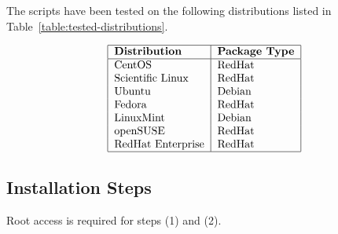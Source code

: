 \documentclass[12pt]{article}
\begin{document}
The scripts have been tested on the following distributions listed in
Table~\ref{table:tested-distributions}.

\begin{table}
$$
\begin{tabular}{|l|l|}
\hline
\bf Distribution & \bf Package Type \\
\hline
CentOS & RedHat \\
Scientific Linux & RedHat \\
Ubuntu & Debian \\
Fedora & RedHat \\
LinuxMint & Debian \\
openSUSE & RedHat \\
RedHat Enterprise & RedHat \\
\hline
\end{tabular}
$$
\caption{Gluex\_install tested distributions.}\label{table:tested-distributions}
\end{table}

\subsection{Installation Steps}

Root access is required for steps (1) and (2).
\end{document}
